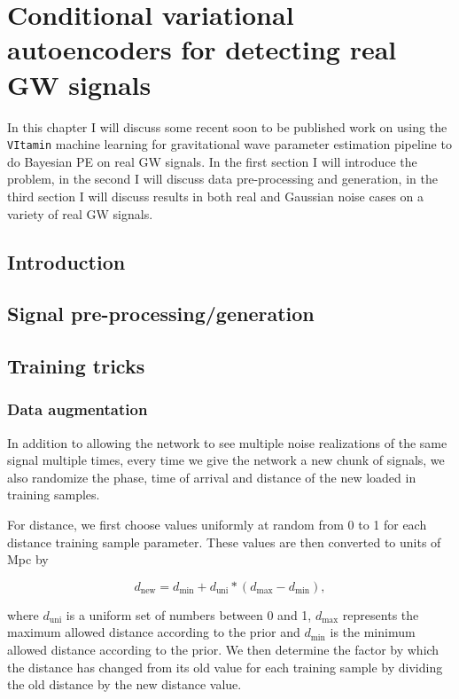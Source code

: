 \chapter[CVAEs for real GW events]{Conditional variational autoencoders for detecting real GW signals}

In this chapter I will discuss some recent soon to be published work on using the \texttt{VItamin} machine learning for gravitational wave parameter estimation pipeline to do Bayesian PE on real \ac{GW} signals. In the first section I will introduce the problem, in the second I will discuss data pre-processing and generation, in the third section I will discuss results in both real and Gaussian noise cases on a variety of real \ac{GW} signals.

\section{Introduction}

\section{Signal pre-processing/generation}

\section{Training tricks}

\subsection{Data augmentation}

In addition to allowing the network to see multiple noise realizations 
of the same signal multiple times, every time we give the network 
a new chunk of signals, we also randomize the phase, time of arrival and 
distance of the new loaded in training samples.

%
%
For distance, we first choose values uniformly at random from 0 to 1 for 
each distance training sample parameter. These values are then 
converted to units of Mpc by 

\begin{equation}\label{eq:dist_rescale}
    d_{\textrm{new}} = d_{\textrm{min}} + d_{\textrm{uni}}*(d_{\textrm{max}} - d_{\textrm{min}}),
\end{equation}

where $d_{\textrm{uni}}$ is a uniform set of numbers between 0 and 1, 
$d_{\textrm{max}}$ represents the maximum allowed distance according to the prior and $d_{\textrm{min}}$ is the minimum allowed distance according to the prior. We then determine the factor by which the distance has changed from its old value for each training sample by dividing the old distance by the new distance value.

